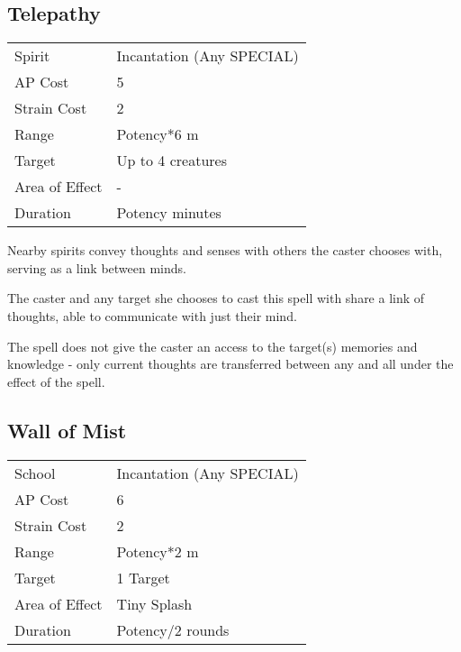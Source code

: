 \documentclass[11pt,a4paper,twocolumn]{book}
\begin{document}
\subsection*{Telepathy}
{
	\begin{tabu} to 75mm{| X[l,4] | X[l,7] |}
		\hline
		Spirit         & Incantation (Any SPECIAL) \\
		AP Cost        & 5                         \\
		Strain Cost    & 2                         \\
		Range          & Potency*6 m               \\
		Target         & Up to 4 creatures         \\
		Area of Effect & -                         \\
		Duration       & Potency minutes           \\ \hline
	\end{tabu}
	
}

\medskip

Nearby spirits convey thoughts and senses with others the caster chooses with, serving as a link between minds.

The caster and any target she chooses to cast this spell with share a link of thoughts, able to communicate with just their mind.

The spell does not give the caster an access to the target(s) memories and knowledge - only current thoughts are transferred between any and all under the effect of the spell.

\subsection*{Wall of Mist}
{
	\begin{tabu} to 75mm{| X[l,4] | X[l,7] |}
		\hline
		School         & Incantation (Any SPECIAL) \\
		AP Cost        & 6                         \\
		Strain Cost    & 2                         \\
		Range          & Potency*2 m               \\
		Target         & 1 Target                  \\
		Area of Effect & Tiny Splash               \\
		Duration       & Potency/2 rounds          \\ \hline
	\end{tabu}
	
}
\end{document}
